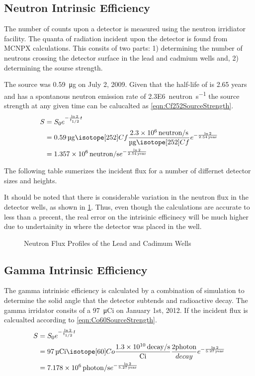 \documentclass[draftcls,onecolumn]{IEEEtran}
\begin{document}
\subsection{Neutron Intrinsic Efficiency}
The number of counts upon a detector is measured using the neutron irridiator facility.
The quanta of radiation incident upon the detector is found from MCNPX calculations.
This consits of two parts: 1) determining the number of neutrons crossing the detector surface in the lead and cadmium wells and, 2) determining the sourse strength.

The  source was \SI{0.59}{\ug} on July 2, 2009.
Given that the half-life of  is 2.65 years and  has a spontanous neutron emission rate of \SI{2.3E6}{neutron\per\second} the source strength at any given time can be calucalted as \eqref{eqn:Cf252SourceStrength}.
\begin{align}
  \label{eqn:Cf252SourceStrength}
  S &= S_0 e^{-\frac{\ln{2}}{t_{1/2}} t} \\ \notag 
    &= \SI{0.59}{\ug} \iso[252]{Cf} \frac{\SI{2.3E6}{neutron\per\second}}{\si{\ug} \iso[252]{Cf}} e^{-\frac{ \ln{2}}{\SI{2.54}{year} }}  \\ \notag
    &= \SI{1.357E6}{neutron\per\second} e^{-\frac{ \ln{2}}{\SI{2.54}{year} }} 
\end{align}

The following table sumerizes the incident flux for a number of differnet detector sizes and heights.


It should be noted that there is considerable variation in the neutron flux in the detector wells, as shown in \ref{fig:NeutronFluxProfiles}.
Thus, even though the calculations are accurate to less than a precent, the real error on the intrisinic efficinecy will be much higher due to undertainity in where the detector was placed in the well.
\begin{figure}
  \label{fig:NeutronFluxProfiles}

  \caption{Neutron Flux Profiles of the Lead and Cadimum Wells}
\end{figure}
\subsection{Gamma Intrinsic Efficiency}

The gamma intrinisic efficiency is calculated by a combination of simulation to determine the solid angle that the detector subtends and radioactive decay.
The gamma irridator consits of a \SI{97}{\micro Ci}  on January 1st, 2012.
If the incident flux is calcualted according to \eqref{eqn:Co60SourceStrength}.
\begin{align}
  \label{eqn:Co60SourceStrength}
  S &= S_0 e^{-\frac{\ln{2}}{t_{1/2}} t} \\ \notag 
    &= \SI{97}{\micro Ci} \iso[60]{Co} \frac{\SI{1.3E10}{decay\per\second}}{\si{Ci}} \frac{2\text{photon}}{decay}e^{-\frac{ \ln{2}}{\SI{5.27}{year} }}  \\ \notag
    &= \SI{7.178E6}{photon\per\second} e^{-\frac{ \ln{2}}{\SI{5.27}{year} }} 
\end{align}
\end{document}
